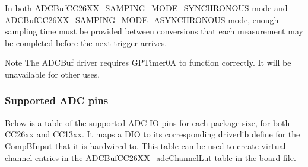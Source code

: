 In both A\+D\+C\+Buf\+C\+C26\+X\+X\+\_\+\+S\+A\+M\+P\+I\+N\+G\+\_\+\+M\+O\+D\+E\+\_\+\+S\+Y\+N\+C\+H\+R\+O\+N\+O\+U\+S mode and A\+D\+C\+Buf\+C\+C26\+X\+X\+\_\+\+S\+A\+M\+P\+I\+N\+G\+\_\+\+M\+O\+D\+E\+\_\+\+A\+S\+Y\+N\+C\+H\+R\+O\+N\+O\+U\+S mode, enough sampling time must be provided between conversions that each measurement may be completed before the next trigger arrives.

\begin{DoxyNote}{Note}
The A\+D\+C\+Buf driver requires G\+P\+Timer0\+A to function correctly. It will be unavailable for other uses.
\end{DoxyNote}
\subsubsection*{Supported A\+D\+C pins}

Below is a table of the supported A\+D\+C I\+O pins for each package size, for both C\+C26xx and C\+C13xx. It maps a D\+I\+O to its corresponding driverlib define for the Comp\+B\+Input that it is hardwired to. This table can be used to create virtual channel entries in the A\+D\+C\+Buf\+C\+C26\+X\+X\+\_\+adc\+Channel\+Lut table in the board file.

